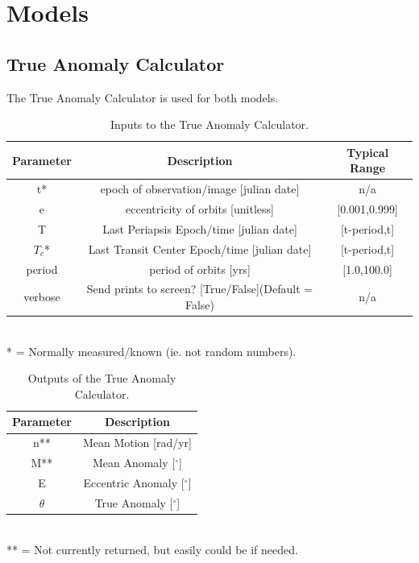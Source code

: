 \documentclass[12pt,preprint]{aastex}
\begin{document}
\section{Models}\label{sec:models}

\subsection{True Anomaly Calculator}\label{sec:TAcalc}
The True Anomaly Calculator is used for both models.

\begin{table}[h]
\centering
\caption{ Inputs to the True Anomaly Calculator.}
\begin{tabular}{c c c}
\hline\hline
Parameter & Description & Typical Range \\
\hline
t* & epoch of observation/image [julian date] & n/a\\
e & eccentricity of orbits [unitless] & [0.001,0.999]\\
T & Last Periapsis Epoch/time [julian date] & [t-period,t]\\
$T_c$* & Last Transit Center Epoch/time [julian date] & [t-period,t]\\
period & period of orbits [yrs] & [1.0,100.0]\\
verbose & Send prints to screen? [True/False](Default = False) & n/a\\
\hline
\end{tabular}
\\
 * = Normally measured/known (ie. not random numbers).
\end{table}


\begin{table}[h]
\centering
\caption{ Outputs of the True Anomaly Calculator.}
\begin{tabular}{c c}
\hline\hline
Parameter & Description \\
\hline
n** & Mean Motion [rad/yr] \\
M** & Mean Anomaly [$^{\circ}$]\\
E & Eccentric Anomaly [$^{\circ}$]\\
$\theta$ & True Anomaly [$^{\circ}$]\\
\hline
\end{tabular}
\\
 ** = Not currently returned, but easily could be if needed.
\end{table}
\pagebreak
\end{document}
